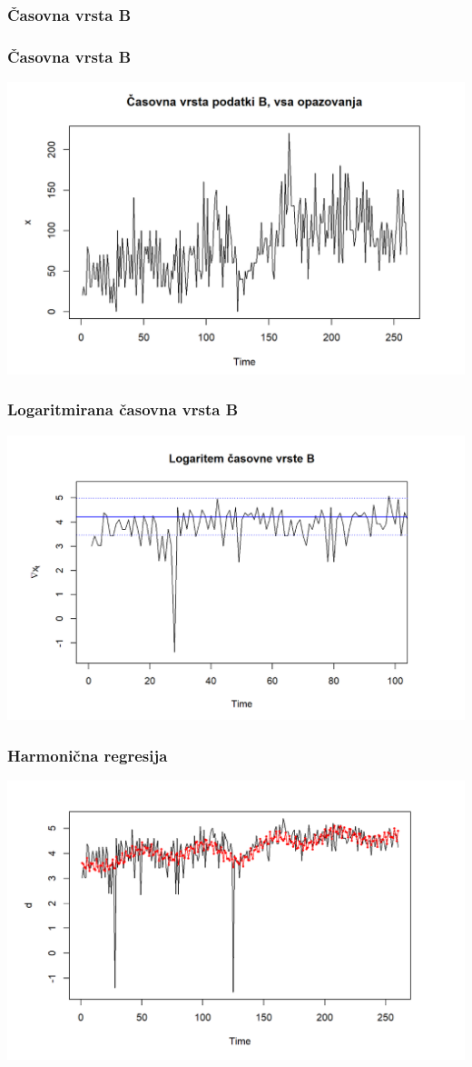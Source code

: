 \documentclass[10pt]{beamer}
\begin{document}
\begin{frame}
\frametitle{Časovna vrsta B}

\end{frame}



\begin{frame}
\frametitle{Časovna vrsta B}
\includegraphics[width=1\textwidth]{casovnaB.png}
\end{frame}

\begin{frame}
\frametitle{Logaritmirana časovna vrsta B}
\includegraphics[width=1\textwidth]{logB.png}
\end{frame}


\begin{frame}
\frametitle{Harmonična regresija}
\includegraphics[width=1\textwidth]{fitB.png}
\end{frame}
\end{document}
